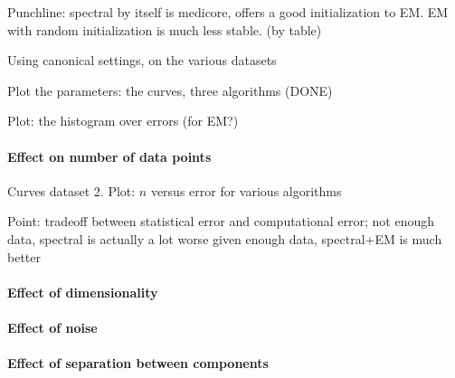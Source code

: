 Punchline: spectral by itself is medicore, offers a good initialization to EM.
EM with random initialization is much less stable. (by table)

Using canonical settings, on the various datasets

Plot the parameters: the curves, three algorithms (DONE)

Plot: the histogram over errors (for EM?)

\paragraph{Effect on number of data points}

Curves dataset 2.
Plot: $n$ versus error for various algorithms

Point: tradeoff between statistical error and computational error;
not enough data, spectral is actually a lot worse
given enough data, spectral+EM is much better

\paragraph{Effect of dimensionality}

\paragraph{Effect of noise}

\paragraph{Effect of separation between components}
